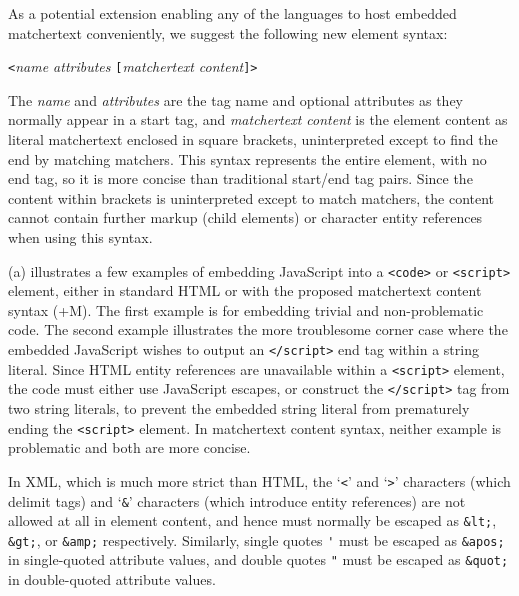 As a potential extension enabling any of the \ml languages
to host embedded matchertext conveniently,
we suggest the following new element syntax:

\begin{center}
\verb|<|\emph{name attributes }\verb|[|\emph{matchertext content}\verb|]>|
\end{center}

The \emph{name} and \emph{attributes} are the tag name and optional attributes
as they normally appear in a start tag,
and \emph{matchertext content} is the element content as literal matchertext
enclosed in square brackets,
uninterpreted except to find the end by matching matchers.
This syntax represents the entire element,
with no end tag,
so it is more concise than traditional start/end tag pairs.
Since the content within brackets is uninterpreted except to match matchers,
the content cannot contain further markup (child elements)
or \ml character entity references when using this syntax.

(a) illustrates a few examples
of embedding JavaScript into a \verb|<code>| or \verb|<script>| element,
either in standard HTML or with the proposed matchertext content syntax (+M).
The first example is for embedding trivial and non-problematic code.
The second example illustrates the more troublesome corner case
where the embedded JavaScript wishes to output
an \verb|</script>| end tag within a string literal.
Since HTML entity references are unavailable within a \verb|<script>| element,
the code must either use JavaScript escapes,
or construct the \verb|</script>| tag from two string literals,
to prevent the embedded string literal from prematurely ending
the \verb|<script>| element.
In matchertext content syntax,
neither example is problematic and both are more concise.


In XML, which is much more strict than HTML,
the `\verb|<|' and `\verb|>|' characters (which delimit tags)
and `\verb|&|' characters (which introduce entity references)
are not allowed at all in element content,
and hence must normally be escaped as
\verb|&lt;|, \verb|&gt;|, or \verb|&amp;| respectively.
Similarly, single quotes \verb|'| must be escaped as \verb|&apos;|
in single-quoted attribute values,
and double quotes \verb|"| must be escaped as \verb|&quot;|
in double-quoted attribute values.



